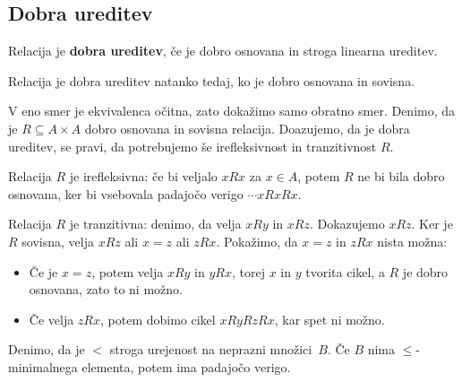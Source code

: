 \subsection{Dobra ureditev}

\begin{definicija}
  Relacija je \textbf{dobra ureditev}, če je dobro osnovana in stroga linearna ureditev.
\end{definicija}

\begin{izrek}
  Relacija je dobra ureditev natanko tedaj, ko je dobro osnovana in sovisna.
\end{izrek}

\begin{dokaz}
  V eno smer je ekvivalenca očitna, zato dokažimo samo obratno smer. Denimo, da je
  $R \subseteq A \times A$ dobro osnovana in sovisna relacija. Doazujemo, da je dobra ureditev, se pravi,
  da potrebujemo še irefleksivnost in tranzitivnost $R$.

  Relacija $R$ je irefleksivna: če bi veljalo $x R x$ za $x \in A$, potem $R$ ne bi bila dobro
  osnovana, ker bi vsebovala padajočo verigo $\cdots x R x R x$.

  Relacija $R$ je tranzitivna: denimo, da velja $x R y$ in $x R z$. Dokazujemo $x R z$. Ker je $R$
  sovisna, velja $x R z$ ali $x = z$ ali $z R x$. Pokažimo, da $x = z$ in $z R x$ nista
  možna:
  \begin{itemize}
  \item Če je $x = z$, potem velja $x R y$ in $y R x$, torej $x$ in $y$ tvorita cikel, a
    $R$ je dobro osnovana, zato to ni možno.
  \item Če velja $z R x$, potem dobimo cikel $x R y R z R x$, kar spet ni možno.
  \end{itemize}
\end{dokaz}

\begin{lema}
  \label{lem:nepr-min-veriga}%
  Denimo, da je $<$ stroga urejenost na neprazni množici~$B$. Če $B$ nima
  $\leq$-minimalnega elementa, potem ima padajočo verigo.
\end{lema}

